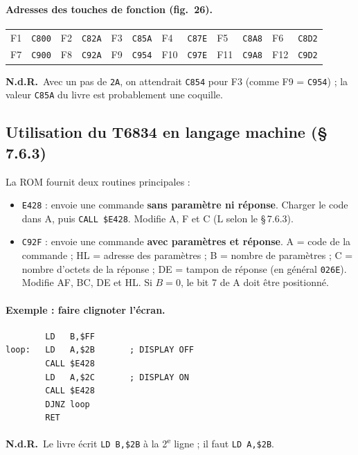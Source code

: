 \documentclass[a4paper,10pt]{article}
\newcommand{\hex}[1]{\texttt{#1}}
\newcommand{\reg}[1]{\textsf{#1}}
\newcommand{\nota}[1]{\textcolor{red!60!black}{\small\textbf{N.d.R.}~#1}}
\begin{document}
\paragraph{Adresses des touches de fonction (fig.~26).}
\begin{center}\small
\begin{tabular}{@{}*{6}{lc}@{}}
\toprule
F1 & \hex{C800} & F2 & \hex{C82A} & F3 & \hex{C85A} & F4 & \hex{C87E} & F5 & \hex{C8A8} & F6 & \hex{C8D2} \\
F7 & \hex{C900} & F8 & \hex{C92A} & F9 & \hex{C954} & F10 & \hex{C97E} & F11 & \hex{C9A8} & F12 & \hex{C9D2} \\
\bottomrule
\end{tabular}
\end{center}
\nota{Avec un pas de \hex{2A}, on attendrait \hex{C854} pour F3 (comme F9 = \hex{C954}) ;
la valeur \hex{C85A} du livre est probablement une coquille.}

\subsection{Utilisation du T6834 en langage machine (§ 7.6.3)}

La ROM fournit deux routines principales :
\begin{itemize}
  \item \hex{E428} : envoie une commande \textbf{sans paramètre ni réponse}.
        Charger le code dans \reg{A}, puis \texttt{CALL \$E428}. Modifie
        \reg{A}, \reg{F} et \reg{C} (\reg{L} selon le §\,7.6.3).
  \item \hex{C92F} : envoie une commande \textbf{avec paramètres et réponse}.
        \reg{A} = code de la commande ; \reg{HL} = adresse des paramètres ;
        \reg{B} = nombre de paramètres ; \reg{C} = nombre d'octets de la
        réponse ; \reg{DE} = tampon de réponse (en général \hex{026E}).
        Modifie \reg{AF}, \reg{BC}, \reg{DE} et \reg{HL}. Si $B=0$, le bit 7
        de \reg{A} doit être positionné.
\end{itemize}

\paragraph{Exemple : faire clignoter l'écran.}
\begin{verbatim}
        LD   B,$FF
loop:   LD   A,$2B       ; DISPLAY OFF
        CALL $E428
        LD   A,$2C       ; DISPLAY ON
        CALL $E428
        DJNZ loop
        RET
\end{verbatim}
\nota{Le livre écrit \texttt{LD B,\$2B} à la 2\textsuperscript{e} ligne ; il faut \texttt{LD A,\$2B}.}
\end{document}
